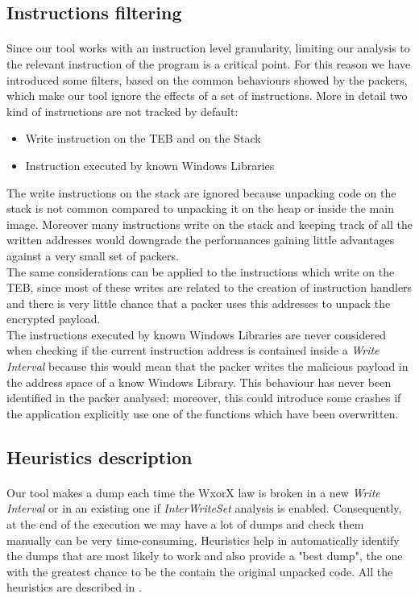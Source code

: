 \subsection{Instructions filtering}
\paragraph{}
Since our tool works with an instruction level granularity, limiting our analysis to the relevant instruction of the program is a critical point. For this reason we have introduced some filters, based on the common behaviours showed by the packers, which make our tool ignore the effects of a set of instructions. More in detail two kind of instructions are not tracked by default:
\begin{itemize}
	\item Write instruction on the \ac{TEB} and on the Stack
	\item Instruction executed by known Windows Libraries
\end{itemize}
The write instructions on the stack are ignored because unpacking code on the stack is not common compared to unpacking it on the heap or inside the main image. Moreover many instructions write on the stack and keeping track of all the written addresses would downgrade the performances gaining little advantages against a very small set of packers.\\
The same considerations can be applied to the instructions which write on the \ac{TEB}, since most of these writes are related to the creation of instruction handlers and there is very little chance that a packer uses this addresses to unpack the encrypted payload.\\
The instructions executed by known Windows Libraries are never considered when checking if the current instruction address is contained inside a \textit{Write Interval} because this would mean that the packer writes the malicious payload in the address space of a know Windows Library. This behaviour has never been identified in the packer analysed; moreover, this could introduce some crashes if the application explicitly use one of the functions which have been overwritten.

\subsection{Heuristics description}
\paragraph{}
Our tool makes a dump each time the \ac{WxorX} law is broken in a new \textit{Write Interval} or in an existing one if \textit{InterWriteSet} analysis is enabled. Consequently, at the end of the execution we may have a lot of dumps and check them manually can be very time-consuming. Heuristics help in automatically identify the dumps that are most likely to work and also provide a "best dump", the one with the greatest chance to be the contain the original unpacked code. All the heuristics are described in \cite{Practical_Malware_Analysis}.
